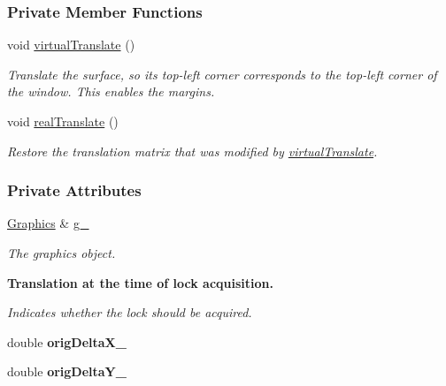 \subsubsection*{Private Member Functions}
\begin{DoxyCompactItemize}
\item 
void \hyperlink{structGroupLock_af67e2076743f8f9847b080c0f0a1cd52}{virtual\+Translate} ()
\begin{DoxyCompactList}\small\item\em Translate the surface, so its top-\/left corner corresponds to the top-\/left corner of the window. This enables the margins. \end{DoxyCompactList}\item 
void \hyperlink{structGroupLock_a123b479eab7e23435bf650e8783f585b}{real\+Translate} ()\hypertarget{structGroupLock_a123b479eab7e23435bf650e8783f585b}{}\label{structGroupLock_a123b479eab7e23435bf650e8783f585b}

\begin{DoxyCompactList}\small\item\em Restore the translation matrix that was modified by \hyperlink{structGroupLock_af67e2076743f8f9847b080c0f0a1cd52}{virtual\+Translate}. \end{DoxyCompactList}\end{DoxyCompactItemize}
\subsubsection*{Private Attributes}
\begin{DoxyCompactItemize}
\item 
\hyperlink{structGraphics}{Graphics} \& \hyperlink{structGroupLock_a8d8f9471928cbed6c036f03fd7976286}{g\+\_\+}\hypertarget{structGroupLock_a8d8f9471928cbed6c036f03fd7976286}{}\label{structGroupLock_a8d8f9471928cbed6c036f03fd7976286}

\begin{DoxyCompactList}\small\item\em The graphics object. \end{DoxyCompactList}\end{DoxyCompactItemize}
\begin{Indent}{\bf Translation at the time of lock acquisition.}\par
{\em Indicates whether the lock should be acquired. }\begin{DoxyCompactItemize}
\item 
double {\bfseries orig\+Delta\+X\+\_\+}\hypertarget{structGroupLock_af6178b0f36f6d6a9b53a78eb3d8956c7}{}\label{structGroupLock_af6178b0f36f6d6a9b53a78eb3d8956c7}

\item 
double {\bfseries orig\+Delta\+Y\+\_\+}\hypertarget{structGroupLock_a07f0e15ce88490877a25f1c2c96c35a9}{}\label{structGroupLock_a07f0e15ce88490877a25f1c2c96c35a9}

\end{DoxyCompactItemize}
\end{Indent}


